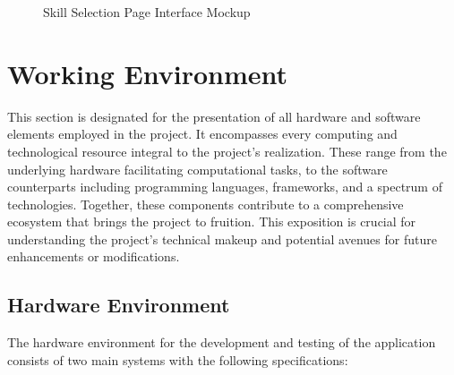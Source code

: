 \begin{figure}[H]
    \centering
    \caption{ Skill Selection Page Interface Mockup }
    \label{fig:Skill-Selection-Page-Interface-Mockup}
\end{figure}



\newpage
\section{Working Environment}
This section is designated for the presentation of all hardware and software elements employed in the project. It encompasses every computing and technological resource integral to the project's realization. These range from the underlying hardware facilitating computational tasks, to the software counterparts including programming languages, frameworks, and a spectrum of technologies. Together, these components contribute to a comprehensive ecosystem that brings the project to fruition. This exposition is crucial for understanding the project's technical makeup and potential avenues for future enhancements or modifications.
\subsection{Hardware Environment}
The hardware environment for the development and testing of the application consists of two main systems with the following specifications:

